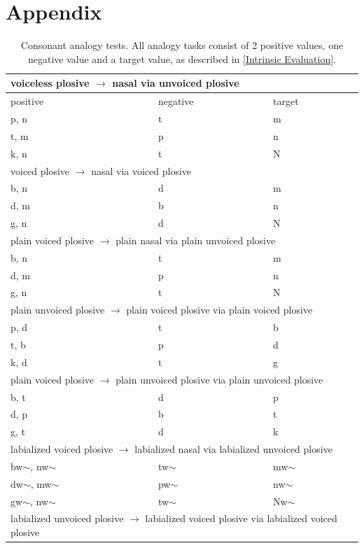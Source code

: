 \documentclass[11pt]{article}
\begin{document}
\section{Appendix}
\begin{table}[h]
\centering
\tiny
\caption{Consonant analogy tests. All analogy tasks consist of 2 positive values, one negative value and a target value, as described in \ref{Intrinsic Evaluation}.}
\begin{tabular}{ l | l | l }
\hline \multicolumn{3}{l}{voiceless plosive $\rightarrow$ nasal via unvoiced plosive}\\  \hline
positive & negative & target \\ \hline
p, n & t & m \\
t, m & p & n \\
k, n & t & N \\ 
 \hline \multicolumn{3}{l}{voiced plosive $\rightarrow$ nasal via voiced plosive}\\  \hline
b, n & d & m \\
d, m & b & n \\
g, n & d & N \\
 \hline \multicolumn{3}{l}{plain voiced plosive $\rightarrow$ plain nasal via plain unvoiced plosive}\\  \hline
b, n & t & m \\
d, m & p & n \\
g, n & t & N \\
 \hline \multicolumn{3}{l}{plain unvoiced plosive $\rightarrow$ plain voiced plosive via plain voiced plosive}\\  \hline
p, d & t & b \\
t, b & p & d \\
k, d & t & g \\
 \hline \multicolumn{3}{l}{plain voiced plosive $\rightarrow$ plain unvoiced plosive via plain unvoiced plosive}\\  \hline
b, t & d & p \\
d, p & b & t \\
g, t & d & k \\
 \hline \multicolumn{3}{l}{labialized voiced plosive $\rightarrow$  labialized nasal via labialized unvoiced plosive}\\  \hline
bw$\sim$, nw$\sim$ & tw$\sim$ & mw$\sim$ \\
dw$\sim$, mw$\sim$ & pw$\sim$ & nw$\sim$ \\
gw$\sim$, nw$\sim$ & tw$\sim$ & Nw$\sim$ \\
 \hline \multicolumn{3}{l}{labialized unvoiced plosive $\rightarrow$ labialized voiced plosive via labialized voiced plosive}\\  \hline

\end{tabular}
\end{table}
\end{document}
